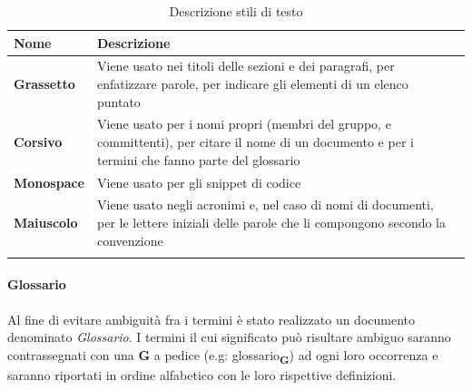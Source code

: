 {	\setlength{\freewidth}{\dimexpr\textwidth-1\tabcolsep}
	\renewcommand{\arraystretch}{1.5}
	\setlength{\aboverulesep}{0pt}
	\setlength{\belowrulesep}{0pt}
	\begin{longtable}{L{.210\freewidth} L{.6\freewidth} L{.080\freewidth}}
		\textbf{Nome} & \textbf{Descrizione} \\
		\toprule
		\endhead		
		\textbf{Grassetto} & Viene usato nei titoli delle sezioni e dei paragrafi, per enfatizzare parole, per indicare gli elementi di un elenco puntato \\
		\textbf{Corsivo} & Viene usato per i nomi propri (membri del gruppo,   e committenti), per citare il nome di un documento e per i termini che fanno parte del glossario\\
		\textbf{Monospace} & Viene usato per gli snippet di codice \\
		\textbf{Maiuscolo} & Viene usato negli acronimi e, nel caso di nomi di documenti, per le lettere iniziali delle parole che li compongono secondo la convenzione \textit{} \\
		\bottomrule
		\hiderowcolors
		\caption{Descrizione stili di testo}
	\end{longtable}
\paragraph*{Glossario}  
Al fine di evitare ambiguità fra i termini è stato realizzato un documento denominato \textit{Glossario}. I termini il cui significato può risultare ambiguo saranno contrassegnati con una \textbf{G} a pedice (e.g: \texorpdfstring{glossario\textsubscript{\textbf{G}}})) ad ogni loro occorrenza e saranno riportati in ordine alfabetico con le loro rispettive definizioni. 
}
